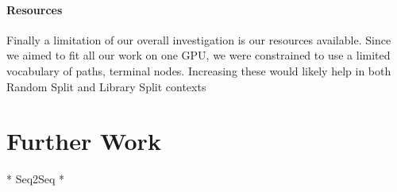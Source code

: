 \paragraph{Resources} 

Finally a limitation of our overall investigation is our resources available. Since we aimed to fit all our work on one GPU, we were constrained to use a limited vocabulary of paths, terminal nodes. Increasing these would likely help in both Random Split and Library Split contexts

\section{Further Work}

* Seq2Seq
* 
